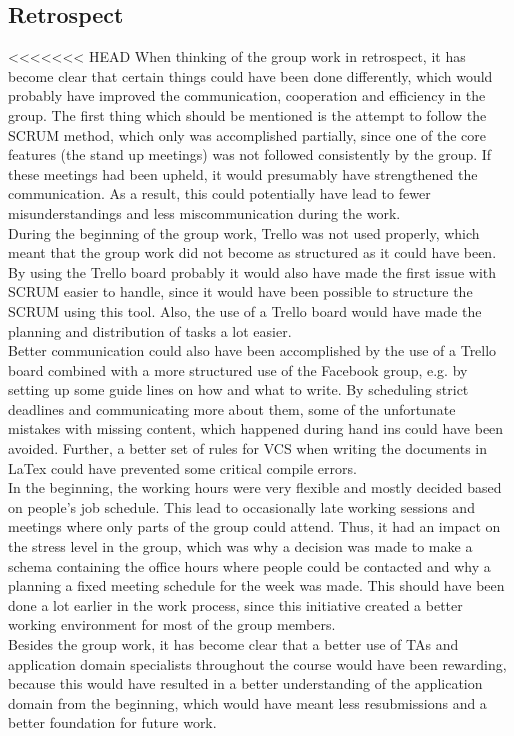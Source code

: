 \subsection{Retrospect}
<<<<<<< HEAD
When thinking of the group work in retrospect, it has become clear that certain things could have been done differently, which would probably have improved the communication, cooperation and efficiency in the group.
The first thing which should be mentioned is the attempt to follow the SCRUM method, which only was accomplished partially, since one of the core features (the stand up meetings) was not followed consistently by the group. If these meetings had been upheld, it would presumably have strengthened the communication. As a result, this could potentially have lead to fewer misunderstandings and less miscommunication during the work.
\\
During the beginning of the group work, Trello was not used properly, which meant that the group work did not become as structured as it could have been. By using the Trello board probably it would also have made the first issue with SCRUM easier to handle, since it would have been possible to structure the SCRUM using this tool. Also, the use of a Trello board would have made the planning and distribution of tasks a lot easier.
\\
Better communication could also have been accomplished by the use of a Trello board combined with a more structured use of the Facebook group, e.g. by setting up some guide lines on how and what to write. By scheduling strict deadlines and communicating more about them, some of the unfortunate mistakes with missing content, which happened during hand ins could have been avoided. Further, a better set of rules for VCS when writing the documents in LaTex could have prevented some critical compile errors.
\\
In the beginning, the working hours were very flexible and mostly decided based on people's job schedule. This lead to occasionally late working sessions and meetings where only parts of the group could attend. Thus, it had an impact on the stress level in the group, which was why a decision was made to make a schema containing the office hours where people could be contacted and why a planning a fixed meeting schedule for the week was made. This should have been done a lot earlier in the work process, since this initiative created a better working environment for most of the group members.
\\
Besides the group work, it has become clear that a better use of TAs and application domain specialists throughout the course would have been rewarding, because this would have resulted in a better understanding of the application domain from the beginning, which would have meant less resubmissions and a better foundation for future work. 
